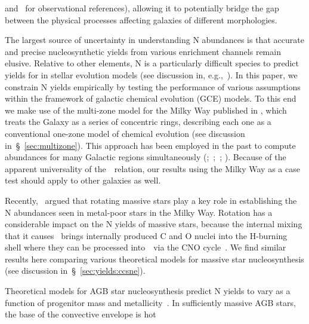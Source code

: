 \documentclass[ms.tex]{subfiles}
\begin{document}
and~\citealp*{Conroy2014} for observational references), allowing it to
potentially bridge the gap between the physical processes affecting galaxies of
different morphologies.
\par
The largest source of uncertainty in understanding N abundances is that
accurate and precise nucleosynthetic yields from various enrichment channels
remain elusive.
Relative to other elements, N is a particularly difficult species to predict
yields for in stellar evolution models (see discussion in,
e.g.,~\citealp{Andrews2017}).
In this paper, we constrain N yields empirically by testing the performance of
various assumptions within the framework of galactic chemical evolution (GCE)
models.
To this end we make use of the multi-zone model for the Milky Way published in
\citet{Johnson2021}, which treats the Galaxy as a series of concentric rings,
describing each one as a conventional one-zone model of chemical evolution
(see discussion in~\S~\ref{sec:multizone}).
This approach has been employed in the past to compute abundances for many
Galactic regions simultaneously (\citealp{Matteucci1989, Wyse1989, Prantzos1995,
Schoenrich2009};~\citealp*{Minchev2013, Minchev2014};~\citealp{Minchev2017};
\citealp*{Sharma2021}).
Because of the apparent universality of the~\ohno~relation, our results using
the Milky Way as a case test should apply to other galaxies as well.
\par
Recently,~\citet*{Grisoni2021} argued that rotating massive stars play a key
role in establishing the N abundances seen in metal-poor stars in the Milky Way.
Rotation has a considerable impact on the N yields of massive stars, because the
internal mixing that it causes~\citep{Zahn1992, Maeder1998, Lagarde2012} brings
internally produced C and O nuclei into the H-burning shell where they can be
processed into~\Nfourteen~via the CNO cycle~\citep{Heger2010, Frischknecht2016,
Andrews2017}.
We find similar results here comparing various theoretical models for
massive star nucleosynthesis (see discussion in~\S~\ref{sec:yields:ccsne}).
\par
Theoretical models for AGB star nucleosynthesis predict N yields to vary as a
function of progenitor mass and metallicity~\citep{Cristallo2011, Cristallo2015,
Karakas2010, Karakas2016, Karakas2018, Ventura2013, Ventura2014, Ventura2018,
Ventura2020}.
In sufficiently massive AGB stars, the base of the convective envelope is hot
\end{document}
